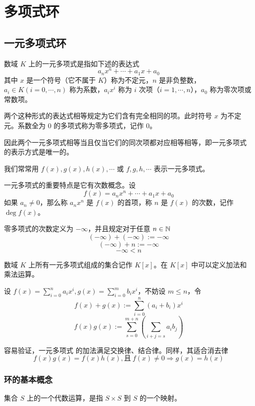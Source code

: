 \chapter{多项式环}

\section{一元多项式环}

\begin{definition}
    数域 $K$ 上的一元多项式是指如下述的表达式
    $$a_nx^n+\cdots + a_1x + a_0$$
    其中 $x$ 是一个符号（它不属于 $K$）称为不定元，$n$ 是非负整数，$a_i\in K(i=0,\cdots,n)$ 称为系数，$a_ix^i$ 称为 $i$ 次项（$i=1,\cdots,n$），$a_0$ 称为零次项或常数项。
\end{definition}

两个这种形式的表达式相等规定为它们含有完全相同的项。此时符号 $x$ 为不定元。系数全为 $0$ 的多项式称为零多项式，记作 $0$。

因此两个一元多项式相等当且仅当它们的同次项都对应相等相等，即一元多项式 的表示方式是唯一的。

我们常常用 $f(x),g(x),h(x),\cdots$ 或 $f,g,h,\cdots$ 表示一元多项式。

一元多项式的重要特点是它有次数概念。设
$$f(x) = a_nx^n+\cdots + a_1x + a_0$$
如果 $a_n\ne 0$，那么称 $a_nx^n$ 是 $f(x)$ 的首项，称 $n$ 是 $f(x)$ 的次数，记作 $\deg f(x)$。

零多项式的次数定义为 $-\infty$，并且规定对于任意 $n\in \mathbb{N}$
$$(-\infty)+(-\infty):=-\infty$$
$$(-\infty) +n := -\infty$$
$$-\infty < n$$

数域 $K$ 上所有一元多项式组成的集合记作 $K[x]$。在 $K[x]$ 中可以定义加法和乘法运算。

设 $f(x) = \displaystyle\sum_{i=0}^na_ix^i,g(x) = \sum_{i=0}^mb_ix^i$，不妨设 $m \leqslant n$，令
$$f(x) + g(x) := \sum_{i=0}^n(a_i+b_i)x^i$$
$$f(x)g(x) := \sum_{s=0}^{m+n}\left(\sum_{i+j=s}a_ib_j\right)$$

容易验证，一元多项式 的加法满足交换律、结合律。同样，其适合消去律
$$f(x)g(x) = f(x)h(x),\text{且}\ f(x)\ne 0 \Rightarrow g(x) = h(x)$$

\subsection{环的基本概念}

集合 $S$ 上的一个代数运算，是指 $S\times S$ 到 $S$ 的一个映射。

